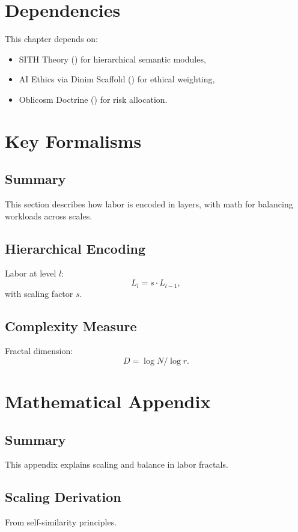 \documentclass[11pt,oneside]{memoir}
\theoremstyle{plain}
\begin{document}
\section{Dependencies}
This chapter depends on:
\begin{itemize}
    \item SITH Theory () for hierarchical semantic modules,
    \item AI Ethics via Dinim Scaffold () for ethical weighting,
    \item Oblicosm Doctrine () for risk allocation.
\end{itemize}

\section{Key Formalisms}
\subsection{Summary}
This section describes how labor is encoded in layers, with math for balancing workloads across scales.

\subsection{Hierarchical Encoding}
Labor at level \(l\):
\begin{equation}
    L_l = s \cdot L_{l-1},
\end{equation}
with scaling factor \(s\).

\subsection{Complexity Measure}
Fractal dimension:
\begin{equation}
    D = \log N / \log r.
\end{equation}

\section{Mathematical Appendix}
\subsection{Summary}
This appendix explains scaling and balance in labor fractals.

\subsection{Scaling Derivation}
From self-similarity principles.
\end{document}
